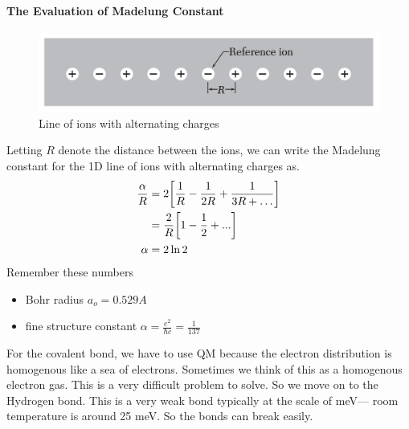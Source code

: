 \documentclass[../main.tex]{subfiles}
\begin{document}
\paragraph{The Evaluation of Madelung Constant}
\begin{figure}[ht]
    \centering
    \includegraphics[width=0.4\linewidth]{ionline.png}
    \caption{Line of ions with alternating charges}
    \label{fig:4.1}
\end{figure}
Letting $R$ denote the distance between the ions, we can write the Madelung constant for the 1D line
of ions with alternating charges as.
\begin{align*}
    \frac{\alpha}{R} &= 2\qt[
        \frac{1}{R} - \frac{1}{2R} + \frac{1}{3R + \dots}
    ] \\
    &= \frac{2}{R} \qt[1 - \frac{1}{2} +...] \\
    \alpha &= 2 \ln{2} 
\end{align*}
Remember these numbers
\begin{itemize}
    \item Bohr radius $a_o = 0.529 {A}$
    \item fine structure constant $\alpha = \frac{e^2}{\hbar c} = \frac{1}{137}$
\end{itemize}
For the covalent bond, we have to use QM because the electron distribution is homogenous like
a sea of electrons. Sometimes we think of this as a homogenous electron gas. This is a very
difficult problem to solve. So we move on to the Hydrogen bond. This is a very weak bond typically
at the scale of meV--- room temperature is around 25 meV. So the bonds can break easily.
\end{document}
